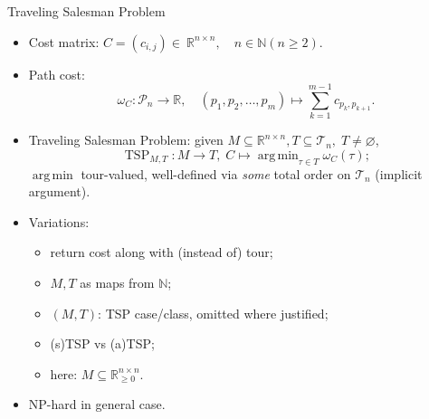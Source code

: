 \documentclass[
  size=8pt,
  style=klope,
  paper=screen,
  mode=present,
  nohandoutpagebreaks,
  pauseslide,
  hlsections,
  fleqn,
]{powerdot}
\DeclareMathOperator*{\argmin}{arg\,min}
\def\eqitspace{\vspace{-5mm}}
\begin{document}
\begin{slide}{Traveling Salesman Problem}
\begin{itemize}
  \item
  Cost matrix: $C = \left(c_{i,j}\right) \in~\mathbb{R}^{n \times n},
    \quad n \in \mathbb{N} \left(n \geq 2\right)$.
  \item
  Path cost:
  \vspace{-2mm}
  \begin{equation}
    \omega_C: \mathcal{P}_n \to \mathbb{R}, \quad
    \left(p_1,p_2,\ldots,p_m\right) \mapsto \sum_{k=1}^{m-1} c_{p_k,p_{k+1}}.
  \end{equation}
  \eqitspace%
  \item
  Traveling Salesman Problem:
  given $M \subseteq \mathbb{R}^{n \times n}, T \subseteq \mathcal{T}_n, \; T \neq \varnothing$,
  \begin{equation}
    \operatorname{TSP}_{M,T} : M \to T, \; C \mapsto \argmin_{\tau \in T} \omega_C\left(\tau\right);
  \end{equation}
  $\argmin$ tour-valued, well-defined via \emph{some} total order on $\mathcal{T}_n$ (implicit argument).
  \item
  Variations:
  \begin{itemize}
  \item return cost along with (instead of) tour;
  \item $M, T$ as maps from $\mathbb{N}$;
  \item $(M, T)$: TSP case/class, omitted where justified;
  \item (s)TSP vs (a)TSP\@;
  \item here: $M \subseteq \mathbb{R}^{n \times n}_{\geq 0}$.
  \end{itemize}
  \vspace{-2mm}
  \item
  NP-hard in general case.
\end{itemize}
\end{slide}
\end{document}

